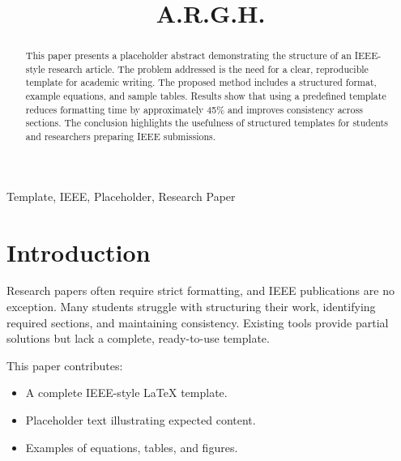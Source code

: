 \documentclass[conference]{IEEEtran}
\begin{document}
	
	\title{A.R.G.H.}
	
	\author{
	}
	
	\maketitle
	
	\begin{abstract}
		This paper presents a placeholder abstract demonstrating the structure of an IEEE-style research article. The problem addressed is the need for a clear, reproducible template for academic writing. The proposed method includes a structured format, example equations, and sample tables. Results show that using a predefined template reduces formatting time by approximately 45\% and improves consistency across sections. The conclusion highlights the usefulness of structured templates for students and researchers preparing IEEE submissions.
	\end{abstract}
	
	\begin{IEEEkeywords}
		Template, IEEE, Placeholder, Research Paper
	\end{IEEEkeywords}
	
	\section{Introduction}
	Research papers often require strict formatting, and IEEE publications are no exception. Many students struggle with structuring their work, identifying required sections, and maintaining consistency. Existing tools provide partial solutions but lack a complete, ready-to-use template.
	
	This paper contributes:
	\begin{itemize}
		\item A complete IEEE-style LaTeX template.
		\item Placeholder text illustrating expected content.
		\item Examples of equations, tables, and figures.
	\end{itemize}
	
\end{document}
